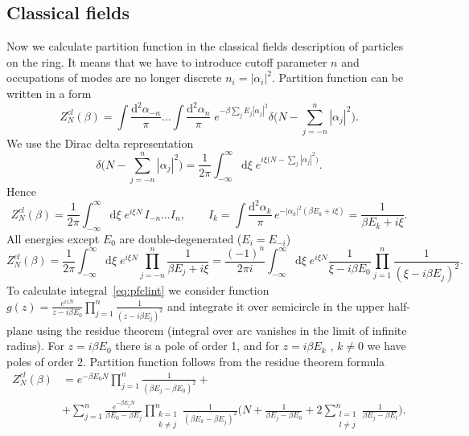 \documentclass[aps,pra,reprint]{revtex4-2}
\begin{document}
\subsection*{Classical fields}
Now we calculate partition function in the classical fields description of 
particles on the ring. It means that we have to introduce cutoff parameter $n$ 
and occupations of modes are no longer discrete $n_i=|\alpha _i |^2$. Partition 
function can be written in a form
\begin{equation}
Z_N^{cl}(\beta) = \int \frac{\mathrm{d}^2 \alpha_{-n}}{\pi} \ldots \int 
\frac{\mathrm{d}^2 \alpha_n}{\pi} \; e^{- \beta \sum_j E_j |\alpha_j|^2} 
\delta \bigg(N-\sum_{j=-n}^n |\alpha_j|^2 \bigg).
\end{equation}
We use  the Dirac delta representation
\begin{equation}
\delta \bigg(N-\sum_{j=-n}^n |\alpha_j|^2 \bigg) = \frac{1}{2 \pi} 
\int_{-\infty}^{\infty} \mathrm{d} \xi \; 
e^{i \xi \big(N-\sum_j |\alpha_j|^2 \big)}.
\end{equation}
Hence
\begin{equation}
Z_N^{cl}(\beta) = \frac{1}{2 \pi} \int_{-\infty}^{\infty} \mathrm{d} \xi \; 
e^{i \xi N} \, I_{-n} \ldots I_n, \qquad I_k = \int 
\frac{\mathrm{d}^2 \alpha_{k}}{\pi} \, e^{-|\alpha_k|^2(\beta E_k+i \xi)} = 
\frac{1}{\beta E_k+ i \xi}.
\end{equation}
All energies except $E_0$ are double-degenerated ($E_i=E_{-i}$)
\begin{equation}
\label{eq:pfclint}
Z_N^{cl}(\beta) = \frac{1}{2 \pi} \int_{-\infty}^{\infty} \mathrm{d} \xi \; 
e^{i \xi N} \prod_{j=-n}^{n} \frac{1}{\beta E_j+i \xi} = \frac{(-1)^n}{2 \pi i} 
\int_{-\infty}^{\infty} \mathrm{d} \xi \; e^{i \xi N} 
\frac{1}{\xi- i \beta E_0} \prod_{j=1}^n \frac{1}{(\xi - i \beta E_j)^2}.
\end{equation}
To calculate integral~\eqref{eq:pfclint} we consider function 
$g(z)=\frac{e^{i z N}}{z-i \beta E_0} \prod_{j=1}^n 
\frac{1}{(z-i \beta E_j)^2}$ and integrate it over semicircle in the upper 
half-plane using the residue theorem (integral over arc vanishes in the limit 
of infinite radius). For $z=i \beta E_0$ there is a pole of order 1, and for 
$z=i \beta E_k$ , $k \neq 0$ we have poles of order 2. 
Partition function follows from the residue theorem formula
\begin{equation}
\label{eq:pfclass}
\begin{split}
Z_N^{cl}(\beta) &= e^{-\beta E_0 N} \prod_{j=1}^n 
\frac{1}{(\beta E_j-\beta E_0)^2}+\\&+\sum_{j=1}^n 
\frac{e^{-\beta E_j N}}{\beta E_0-\beta E_j} 
\prod_{\substack{k=1 \\ k \neq j}}^n \frac{1}{(\beta E_k -\beta E_j)^2} 
\Bigg(N + \frac{1}{\beta E_j-\beta E_0} + 2\sum_{\substack{l=1 \\ l \neq j}}^n 
\frac{1}{\beta E_j-\beta E_l} \Bigg).
\end{split}  
\end{equation}
\end{document}
